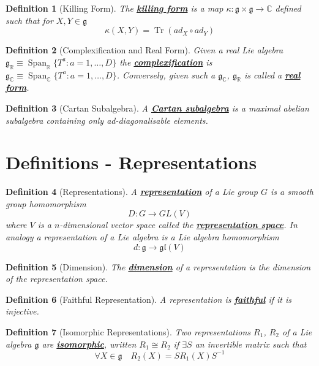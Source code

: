 \documentclass{article}
\newtheorem{definition}{Definition}[section]
\DeclareMathOperator{\spn}{Span}
\DeclareMathOperator{\tr}{Tr}
\newcommand{\bam}[1]{\underline{\bf{#1}}}
\newcommand{\mf}[1]{\mathfrak{#1}}
\newcommand{\mbb}[1]{\mathbb{#1}}
\begin{document}
\begin{definition}[Killing Form]
The \bam{killing form} is a map $\kappa:\mf{g}\times\mf{g}\to\mbb{C}$ defined such that for $X,Y\in\mf{g}$
\[
\kappa\left(X,Y\right)=\tr\left(ad_X \circ ad_Y\right)
\]
\end{definition}

\begin{definition}[Complexification and Real Form]
Given a  real Lie algebra $\mf{g}_\mathbb{R}\equiv\spn_{\mathbb{R}}\lbrace T^a : a=1, \dots, D \rbrace$ the \bam{complexification}
is $\mf{g}_\mathbb{C}\equiv\spn_{\mathbb{C}}\lbrace T^a : a=1, \dots, D \rbrace$. Conversely, given such a $\mf{g}_\mathbb{C}$, $\mf{g}_\mathbb{R}$ is called a \bam{real form}.  
\end{definition}

\begin{definition}[Cartan Subalgebra]
A \bam{Cartan subalgebra} is a maximal abelian subalgebra containing only ad-diagonalisable elements.  
\end{definition}


\section{Definitions - Representations}

\begin{definition}[Representations]
A \bam{representation} of a Lie group $G$ is a smooth group homomorphism 
\[
D:G\to GL\left(V\right)
\]
where $V$ is a $n$-dimensional vector space called the \bam{representation space}.
In analogy a representation of a Lie algebra is a Lie algebra homomorphism 
\[
d:\mf{g} \to \mf{gl}\left(V\right)
\]
\end{definition}

\begin{definition}[Dimension]
The \bam{dimension} of a representation is the dimension of the representation space.
\end{definition}

\begin{definition}[Faithful Representation]
A representation is \bam{faithful} if it is injective. 
\end{definition}

\begin{definition}[Isomorphic Representations]
Two representations $R_1$, $R_2$ of a Lie algebra $\mf{g}$ are \bam{isomorphic}, written $R_1 \cong R_2$ if $\exists S$ an invertible matrix such that 
\[
\forall X\in\mf{g} \quad R_2\left(X\right)=S R_1\left(X\right) S^{-1}
\]
\end{definition}
\end{document}
